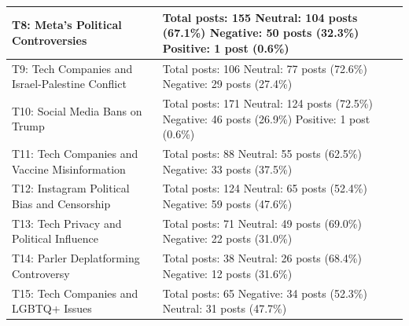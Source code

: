 \begin{longtable}{|p{6cm}|p{10cm}|}
\hline
T8: Meta's Political Controversies & Total posts: 155 \newline Neutral: 104 posts (67.1\%) \newline Negative: 50 posts (32.3\%) \newline Positive: 1 post (0.6\%) \\
\hline
T9: Tech Companies and Israel-Palestine Conflict & Total posts: 106 \newline Neutral: 77 posts (72.6\%) \newline Negative: 29 posts (27.4\%) \\
\hline
T10: Social Media Bans on Trump & Total posts: 171 \newline Neutral: 124 posts (72.5\%) \newline Negative: 46 posts (26.9\%) \newline Positive: 1 post (0.6\%) \\
\hline
T11: Tech Companies and Vaccine Misinformation & Total posts: 88 \newline Neutral: 55 posts (62.5\%) \newline Negative: 33 posts (37.5\%) \\
\hline
T12: Instagram Political Bias and Censorship & Total posts: 124 \newline Neutral: 65 posts (52.4\%) \newline Negative: 59 posts (47.6\%) \\
\hline
T13: Tech Privacy and Political Influence & Total posts: 71 \newline Neutral: 49 posts (69.0\%) \newline Negative: 22 posts (31.0\%) \\
\hline
T14: Parler Deplatforming Controversy & Total posts: 38 \newline Neutral: 26 posts (68.4\%) \newline Negative: 12 posts (31.6\%) \\
\hline
T15: Tech Companies and LGBTQ+ Issues & Total posts: 65 \newline Negative: 34 posts (52.3\%) \newline Neutral: 31 posts (47.7\%) \\
\hline
\end{longtable}

